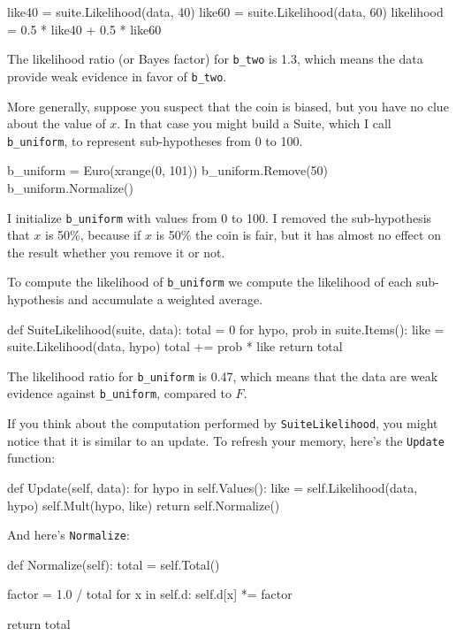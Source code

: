 \documentclass[12pt]{book}
\theoremstyle{exercise}
\newcommand{\py}[1]{{\tt #1}}%
\begin{document}
\begin{code}
    like40 = suite.Likelihood(data, 40)
    like60 = suite.Likelihood(data, 60)
    likelihood = 0.5 * like40 + 0.5 * like60
\end{code}

The likelihood ratio (or Bayes factor) for \verb"b_two" is 1.3, which
means the data provide weak evidence in favor of \verb"b_two".

More generally, suppose you suspect that the coin is biased, but you
have no clue about the value of $x$.  In that case you might build a
Suite, which I call \verb"b_uniform", to represent sub-hypotheses from
0 to 100.

\begin{code}
    b_uniform = Euro(xrange(0, 101))
    b_uniform.Remove(50)
    b_uniform.Normalize()
\end{code}

I initialize \verb"b_uniform" with values from 0 to 100.
I removed the sub-hypothesis that $x$ is 50\%, because if
$x$ is 50\% the coin is fair, but it has almost no
effect on the result whether you remove it or not.

To compute the likelihood of
\verb"b_uniform" we compute the likelihood of each sub-hypothesis
and accumulate a weighted average.

\begin{code}
def SuiteLikelihood(suite, data):
    total = 0
    for hypo, prob in suite.Items():
        like = suite.Likelihood(data, hypo)
        total += prob * like
    return total
\end{code}

The likelihood ratio for \verb"b_uniform" is 0.47, which means
that the data are weak evidence against \verb"b_uniform",
compared to $F$.

If you think about the computation performed by
\verb"SuiteLikelihood", you might notice that it is similar to an
update.  To refresh your memory, here's the \py{Update} function:

\begin{code}
    def Update(self, data):
        for hypo in self.Values():
            like = self.Likelihood(data, hypo)
            self.Mult(hypo, like)
        return self.Normalize()
\end{code}

And here's \py{Normalize}:

\begin{code}
    def Normalize(self):
        total = self.Total()

        factor = 1.0 / total
        for x in self.d:
            self.d[x] *= factor

        return total
\end{code}
\end{document}

